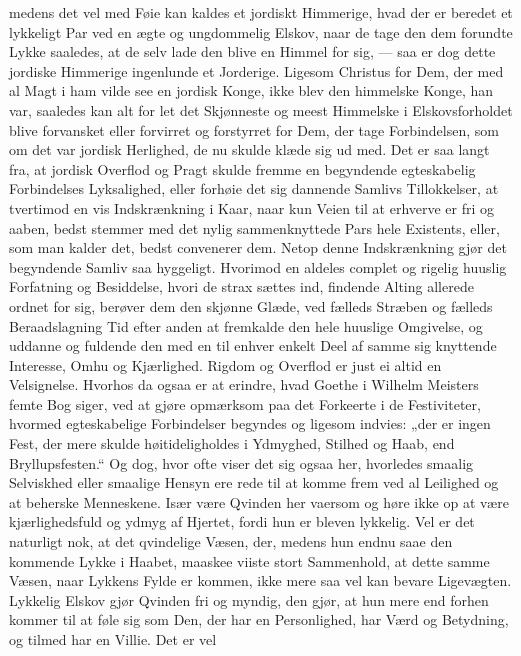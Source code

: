 \documentclass[12pt,a4paper]{book}
\newcommand{\apage}[1]{\marginnote{\footnotesize\textit{[#1]}}}
\begin{document}
medens det vel med Føie kan kaldes et jordiskt Himmerige, hvad der er
beredet et lykkeligt Par ved en ægte og ungdommelig Elskov, naar de tage
den dem forundte Lykke saaledes, at de selv lade den blive en Himmel for
sig, --- saa er dog dette jordiske Himmerige ingenlunde et Jorderige.
Ligesom Christus for Dem, der med al Magt i ham vilde see en jordisk
Konge, ikke blev den himmelske Konge, han var, saaledes kan alt for let
det Skjønneste og meest Himmelske i Elskovsforholdet blive forvansket
eller forvirret og forstyrret for Dem, der tage Forbindelsen, som om det
var jordisk Herlighed, de nu skulde klæde sig ud med. Det er saa langt
fra, at jordisk Overflod og Pragt skulde fremme en \apage{109} begyndende
egteskabelig Forbindelses Lyksalighed, eller forhøie det sig dannende
Samlivs Tillokkelser, at tvertimod en vis Indskrænkning i Kaar, naar kun
Veien til at erhverve er fri og aaben, bedst stemmer med det nylig
sammenknyttede Pars hele Existents, eller, som man kalder det, bedst
convenerer dem. Netop denne Indskrænkning gjør det begyndende Samliv saa
hyggeligt. Hvorimod en aldeles complet og rigelig huuslig Forfatning og
Besiddelse, hvori de strax sættes ind, findende Alting allerede ordnet
for sig, berøver dem den skjønne Glæde, ved fælleds Stræben og fælleds
Beraadslagning Tid efter anden at fremkalde den hele huuslige Omgivelse,
og uddanne og fuldende den med en til enhver enkelt Deel af samme sig
knyttende Interesse, Omhu og Kjærlighed. Rigdom og Overflod er just ei
altid en Velsignelse. Hvorhos da ogsaa er at erindre, hvad Goethe i
Wilhelm Meisters femte Bog siger, ved at gjøre opmærksom paa det
Forkeerte i de Festiviteter, hvormed egteskabelige Forbindelser begyndes
og ligesom indvies: „der er ingen Fest, der mere skulde høitideligholdes
i Ydmyghed, Stilhed og Haab, end Bryllupsfesten.“ Og dog, hvor ofte
viser det sig ogsaa her, hvorledes smaalig Selviskhed eller smaalige
Hensyn ere rede til at komme frem ved al Leilighed og at beherske
Menneskene. Især være Qvinden her vaersom og høre ikke op at være
kjærlighedsfuld og ydmyg af Hjertet, fordi hun er bleven lykkelig. Vel
er det naturligt nok, at det qvindelige Væsen, der, medens hun \apage{110} endnu
saae den kommende Lykke i Haabet, maaskee viiste stort Sammenhold, at
dette samme Væsen, naar Lykkens Fylde er kommen, ikke mere saa vel kan
bevare Ligevægten. Lykkelig Elskov gjør Qvinden fri og myndig, den gjør,
at hun mere end forhen kommer til at føle sig som Den, der har en
Personlighed, har Værd og Betydning, og tilmed har en Villie. Det er vel
\end{document}
